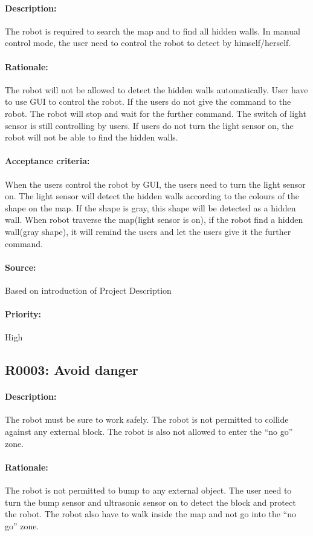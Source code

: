 \documentclass[11pt, a4paper]{report}
\begin{document}
\paragraph{Description: }
The robot is required to search the map and to find all hidden walls. In manual control mode, the user need to control the robot to detect by himself/herself.
\paragraph{Rationale: }
The robot will not be allowed to detect the hidden walls automatically. User have to use GUI to control the robot. If the users do not give the command  to the robot. The robot will stop and wait for the further command. The switch of light sensor is still controlling by users. If users do not turn the light sensor on, the robot will not be able to find the hidden walls.  
\paragraph{Acceptance criteria: }
When the users control the robot by GUI, the users need to turn the light sensor on. The light sensor will detect the hidden walls according to the colours of the shape on the map. If the shape is gray, this shape will be detected as a hidden wall. When robot traverse the map(light sensor is on), if the robot find a hidden wall(gray shape), it will remind the users and let the users give it the further command.
\paragraph{Source: }
Based on introduction of Project Description
\paragraph{Priority: }
High



\subsection{R0003: Avoid danger}
\paragraph{Description:}
The robot must be sure to work safely. The robot is not permitted to collide against any external block. The robot is also not allowed to enter the “no go” zone.
\paragraph{Rationale:}
The robot is not permitted to bump to any external object. The user need to turn the bump sensor and ultrasonic sensor on to detect the block and protect the robot. The robot also have to walk inside the map and not go into the “no go” zone.  
\end{document}
